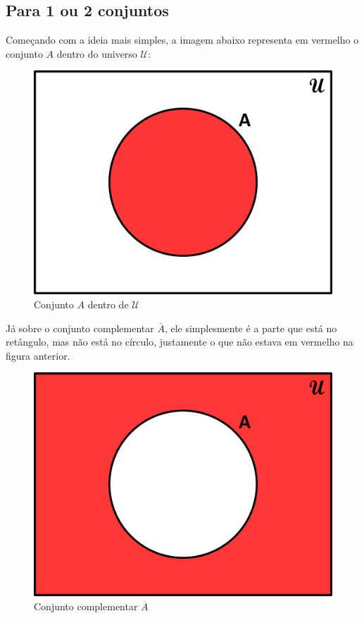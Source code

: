 \subsection{Para 1 ou 2 conjuntos}
Começando com a ideia mais simples, a imagem abaixo representa em vermelho o conjunto $A$ dentro do universo $\mathcal U$:

\begin{figure}[h!]
  \centering
  \includegraphics[scale=0.3]{figures/sets/fig_sets_03_01.pdf}
  \caption{Conjunto $A$ dentro de $\mathcal U$}
  \label{fig:sets_03_01}
\end{figure}

Já sobre o conjunto complementar $\overline A$, ele simplesmente é a parte que está no retângulo, mas não está no círculo, justamente o que não estava em vermelho na figura anterior.

\begin{figure}[h!]
  \centering
  \includegraphics[scale=0.3]{figures/sets/fig_sets_03_02.pdf}
  \caption{Conjunto complementar $\overline A$}
  \label{fig:sets_03_02}
\end{figure}

